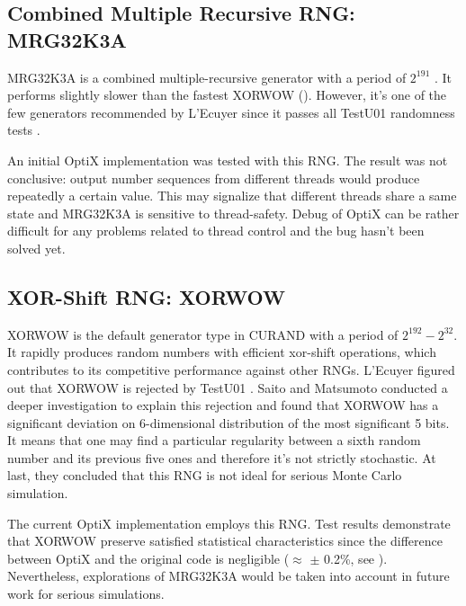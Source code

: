 
\subsection{Combined Multiple Recursive RNG: MRG32K3A}
MRG32K3A is a combined multiple-recursive generator with a period of $2^{191}$ \citep{l1999good}. It performs slightly slower than the fastest XORWOW (). However, it's one of the few generators recommended by L'Ecuyer since it passes all TestU01 randomness tests \cite{lecuyer}. 

An initial OptiX implementation was tested with this RNG. The result was not conclusive: output number sequences from different threads would produce repeatedly a certain value. This may signalize that different threads share a same state and MRG32K3A is sensitive to thread-safety. Debug of OptiX can be rather difficult for any problems related to thread control and the bug hasn't been solved yet.


\subsection{XOR-Shift RNG: XORWOW}
XORWOW is the default generator type in CURAND with a period of $2^{192}-2^{32}$. It rapidly produces random numbers with efficient xor-shift operations, which contributes to its competitive performance against other RNGs. L'Ecuyer figured out that XORWOW is rejected by TestU01 \citep{l1999good}. Saito and Matsumoto conducted a deeper investigation to explain this rejection \citep{xorwow} and found that XORWOW has a significant deviation on 6-dimensional distribution of the most significant 5 bits. It means that one may find a particular regularity between a sixth random number and its previous five ones and therefore it's not strictly stochastic. At last, they concluded that this RNG is not ideal for serious Monte Carlo simulation.

The current OptiX implementation employs this RNG. Test results demonstrate that XORWOW preserve satisfied statistical characteristics since the difference between OptiX and the original code is negligible ($\approx$ $\pm$ 0.2\%, see ). Nevertheless, explorations of MRG32K3A would be taken into account in future work for serious simulations.

